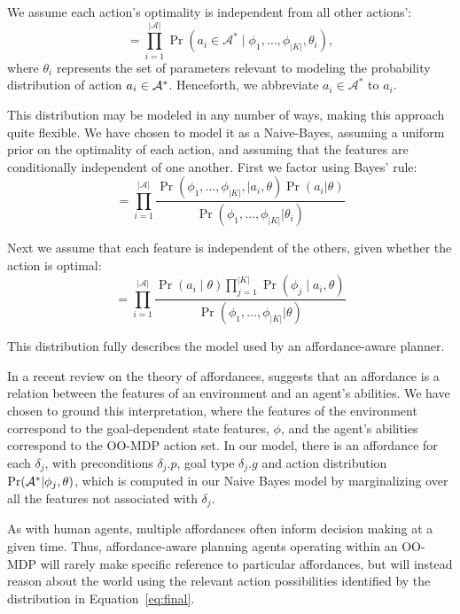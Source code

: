 \documentclass[conference]{IEEEtran}
\begin{document}
We assume each action's optimality is independent from all other actions':
\begin{equation}
= \prod_{i=1}^{|\mathcal{A}|} \Pr(a_i \in \mathcal{A}^* \mid \phi_1, \ldots, \phi_{|K|}, \theta_i),
\label{eq:action_independ}
\end{equation}
where $\theta_i$ represents the set of parameters relevant to modeling the probability distribution of action $a_i \in {\cal A}^*$. Henceforth, we abbreviate $a_i \in \mathcal{A}^*$ to $a_i$.

This distribution may be modeled in any number of ways, making this approach quite flexible.
We have chosen to model it as a Naive-Bayes, assuming a uniform prior
on the optimality of each action, and assuming that the features are
conditionally independent of one another.  First we factor using Bayes' rule:
\begin{equation}
= \prod_{i=1}^{|\mathcal{A}|} \frac{\Pr(\phi_1, \ldots, \phi_{|K|}, \mid a_i, \theta) \Pr(a_i | \theta)}{\Pr(\phi_1, \ldots, \phi_{|K|} | \theta_i)}
\label{eq:bayes}
\end{equation}

Next we assume that each feature is independent of the others, given
whether the action is optimal:
\begin{equation}
= \prod_{i=1}^{|\mathcal{A}|} \frac{\Pr(a_i \mid \theta) \prod_{j=1}^{|K|} \Pr(\phi_j \mid a_i, \theta) }{\Pr(\phi_1, \ldots, \phi_{|K|} | \theta)}
\label{eq:final}
\end{equation}

This distribution fully describes the model used by an affordance-aware planner. 

In a recent review on the theory of affordances, \citet{chemero2003} suggests that an affordance is a relation between the features of an environment and an agent's abilities. We have chosen to ground this interpretation, where the features of the environment correspond to the goal-dependent state features, $\phi$, and the agent's abilities correspond to the OO-MDP action set. In our model, there is an affordance for each $\delta_j$, with preconditions $\delta_j.p$, goal type $\delta_j.g$ and action distribution $\Pr({\cal A}^* | \phi_j, \theta)$, which is computed in our Naive Bayes model by marginalizing over all the features not associated with $\delta_j$.
  
As with human agents, multiple affordances often inform decision making at a given time.
Thus, affordance-aware planning agents operating within an OO-MDP will
rarely make specific reference to particular affordances, but will
instead reason about the world using the relevant action possibilities
identified by the distribution in Equation~\ref{eq:final}. 
\end{document}
